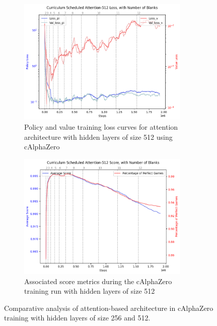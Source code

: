 \documentclass[10pt, reqno, letterpaper, twoside]{amsart}
\begin{document}
\begin{figure}[ht]
    \begin{subfigure}[b]{0.45\textwidth}
        \centering
        \includegraphics[width=0.9\textwidth]{images/Curriculum Scheduled Attention-512 Loss.png}
        \caption{Policy and value training loss curves for attention architecture with hidden layers of size 512 using cAlphaZero}
        \label{fig:attention-512-loss}
    \end{subfigure}
    \hfill
    \begin{subfigure}[b]{0.45\textwidth}
        \centering
        \includegraphics[width=0.9\textwidth]{images/Curriculum Scheduled Attention-512 Score.png}
        \caption{Associated score metrics during the cAlphaZero training run with hidden layers of size 512}
        \label{fig:attention-512-score}
    \end{subfigure}

    \caption{Comparative analysis of attention-based architecture in cAlphaZero training with hidden layers of size 256 and 512.}
    \label{fig:attention-loss}
\end{figure}
\newpage
\end{document}
